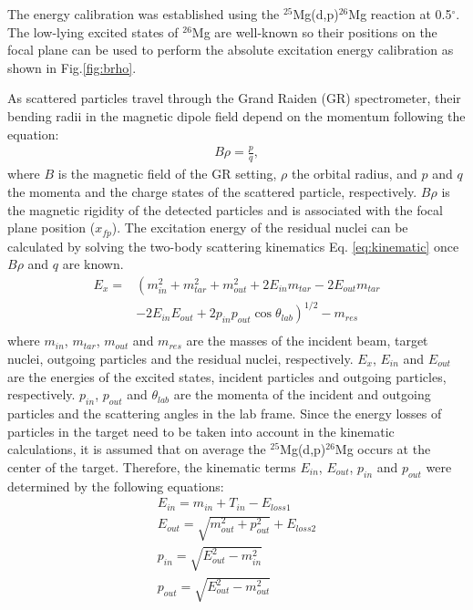 The energy calibration was established using the $^{25}$Mg(d,p)$^{26}$Mg reaction at 0.5$^{\circ}$. The low-lying excited states of $^{26}$Mg are well-known\citep{Cujec1964} so their positions on the focal plane can be used to perform the absolute excitation energy calibration  as shown in Fig.\ref{fig:brho}.

As scattered particles travel through the Grand Raiden (GR) spectrometer, their bending radii in the magnetic dipole  field depend on the momentum following the equation:
\begin{equation}
    \label{eq:brho}
    \begin{aligned}
       B\rho = \frac{p}{q},
    \end{aligned}
\end{equation}
where $B$ is the magnetic field of the GR setting, $\rho$  the orbital radius, and $p$ and $q$  the momenta and the charge states of the scattered particle, respectively. $B\rho$ is  the magnetic rigidity of the detected particles and is associated with the focal plane position ($x_{fp}$). The excitation energy of the residual nuclei can be calculated by solving the two-body scattering kinematics Eq. \ref{eq:kinematic} once $B\rho$ and $q$ are known.
\begin{equation}
    \label{eq:kinematic}
    \begin{aligned}
 E_x = & \left(  { m^2_{in} + m^2_{tar} + m^2_{out} + 2E_{in}m_{tar}-2E_{out}m_{tar}}  \right. \\
       & \left.  { -2 E_{in}E_{out}+2p_{in}p_{out}\cos\theta_{lab} }        \right) ^{1/2} -m_{res} \\
    \end{aligned}
\end{equation}
where $m_{in}$, $m_{tar}$, $m_{out}$ and $m_{res}$ are the masses of the incident beam, target nuclei, outgoing particles and the residual nuclei, respectively. $E_x$, $E_{in}$ and $E_{out}$ are the energies of the excited states, incident  particles and outgoing particles, respectively. $p_{in}$, $p_{out}$ and $\theta_{lab}$ are the momenta of the incident and outgoing particles and the scattering angles in the lab frame. Since the energy losses of particles in the target need to be taken into account in the kinematic calculations, it is assumed that on average the $^{25}$Mg(d,p)$^{26}$Mg occurs at the center of the target. Therefore, the kinematic terms $E_{in}$, $E_{out}$, $p_{in}$ and $p_{out}$ were determined by the following equations:
\begin{equation}
    \label{eq:kinematic2}
    \begin{aligned}
        E_{in}  = m_{in} + T_{in} - E_{loss1} \\
        E_{out} = \sqrt{m_{out}^2 + p^2_{out}} + E_{loss2} \\
        p_{in}  = \sqrt{E_{out}^2-m_{in}^2}   \\
        p_{out} = \sqrt{E_{out}^2 - m_{out}^2}
     \end{aligned}
\end{equation}
